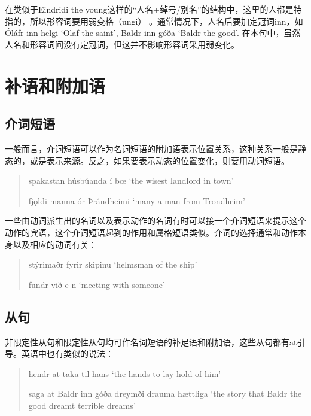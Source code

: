 在类似于Eindridi the young这样的“人名+绰号/别名”的结构中，这里的人都是特指的，所以形容词要用弱变格（ungi） 。通常情况下，人名后要加定冠词inn，如Óláfr inn helgi `Olaf the saint', Baldr inn góða `Baldr the good'. 在本句中，虽然人名和形容词间没有定冠词，但这并不影响形容词采用弱变化。

\section{补语和附加语}
\subsection{介词短语}
一般而言，介词短语可以作为名词短语的附加语表示位置关系，这种关系一般是静态的，或是表示来源。反之，如果要表示动态的位置变化，则要用动词短语。
\begin{quote}
    spakastan húsbúanda í bœ `the wisest landlord in town'

    fjǫldi manna ór Þrándheimi `many a man from Trondheim'
\end{quote}
一些由动词派生出的名词以及表示动作的名词有时可以接一个介词短语来提示这个动作的宾语，这个介词短语起到的作用和属格短语类似。介词的选择通常和动作本身以及相应的动词有关：
\begin{quote}
    stýrimaðr fyrir skipinu `helmsman of the ship'

    fundr við e-n `meeting with someone'
\end{quote}

\subsection{从句}
非限定性从句和限定性从句均可作名词短语的补足语和附加语，这些从句都有at引导。英语中也有类似的说法：
\begin{quote}
    hendr at taka til hans `the hands to lay hold of him'

    saga at Baldr inn góða dreymði drauma hættliga `the story that Baldr the good dreamt terrible dreams'

\end{quote}


